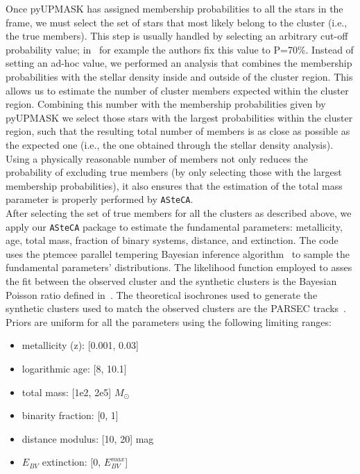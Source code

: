 \documentclass[draft]{aa}
\begin{document}
  Once pyUPMASK has assigned membership probabilities to all the stars in the
  frame, we must select the set of stars that most likely belong to the
  cluster (i.e., the true members). This step is usually handled by selecting
  an arbitrary cut-off probability value; in~\cite{Cantat_2020} for example
  the authors fix this value to P=70\%. Instead of setting an ad-hoc value, we
  performed an analysis that combines the membership probabilities with the
  stellar density inside and outside of the cluster region. This allows us to
  estimate the number of cluster members expected within the cluster region.
  Combining this number with the membership probabilities given by pyUPMASK we
  select those stars with the largest probabilities within the cluster region,
  such that the resulting total number of members is as close as possible as the
  expected one (i.e., the one obtained through the stellar density analysis).
  Using a physically reasonable number of members not only reduces the
  probability of excluding true members (by only selecting those with the
  largest membership probabilities), it also ensures that the estimation of the
  total mass parameter is properly performed by \texttt{ASteCA}.\\

  After selecting the set of true members for all the clusters as described
  above, we apply our \texttt{ASteCA} package to estimate the fundamental
  parameters: metallicity, age, total mass, fraction of binary systems,
  distance, and extinction. The code uses the ptemcee parallel tempering
  Bayesian inference algorithm~\citep{ptemcee} to sample the fundamental
  parameters' distributions. The likelihood function employed to asses the fit
  between the observed cluster and the synthetic clusters is the Bayesian
  Poisson ratio defined in~\cite{Tremmel_2013}.
  The theoretical isochrones used to generate the
  synthetic clusters used to match the observed clusters are the PARSEC
  tracks~\citep{Bressan_2012}. Priors are uniform for all the parameters using
  the following limiting ranges:

  \begin{itemize}
   \item metallicity (z): [0.001, 0.03]
   \item logarithmic age: [8, 10.1]
   \item total mass: [1e2, 2e5] $M_{\odot}$
   \item binarity fraction: [0, 1]
   \item distance modulus: [10, 20] mag
   \item $E_{BV}$ extinction: [0, $E_{BV}^{max}$]
  \end{itemize}
\end{document}
